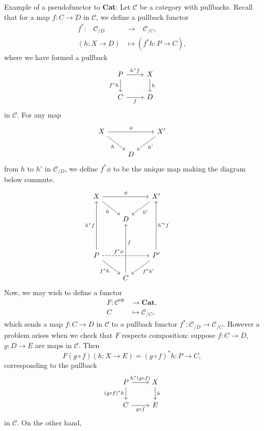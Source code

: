 \documentclass{MetricNotes2023}
\begin{document}
Example of a pseudofunctor to \textbf{Cat}: Let \(\mathcal{C}\) be a category with pullbacks. Recall that for a map \(f : C \to D\) in \(\mathcal{C}\), we define a pullback functor 
\begin{align*}
f^* : \;\;\;\mathcal{C}_{/D}\;\;\;&\to\;\;\; \mathcal{C}_{/C},\\
(h : X \to D) &\mapsto (f^*h : P \to C),
\end{align*}
 where we have formed a pullback 
\[\begin{tikzcd}
P \arrow[r, "h^*f"] \arrow[d, swap, "f^*h"]  & X \arrow[d, "h"]  \\
C \arrow[r, swap, "f"]  & D
\end{tikzcd}\]
in \(\mathscr{C}\). For any map 
\[\begin{tikzcd}
X \arrow[rr, "\phi"] \arrow[dr, swap, "h"]  & & X' \arrow[dl, "h'"]  \\
& D  & 
\end{tikzcd}\]
from \(h\) to \(h'\) in \(\mathcal{C}_{/D}\), we define \(f^*\phi\) to be the unique map making the diagram below commute.
\[\begin{tikzcd}
X \arrow[rr, "\phi"] \arrow[dr, swap, "h"]  & & X' \arrow[dl, "h'"]  \\
& D  & \\
& & & \\
P \arrow[rr, dashrightarrow, "f^*\phi" {xshift=-10pt}] \arrow[uuu, "h^*f"] \arrow[dr, swap, "f^*h"] & & P' \arrow[uuu, swap, "h'^*f"] \arrow[dl, "f^*h'"]\\
& C \arrow[uuu, swap, "f" {yshift=8pt}] & 
\end{tikzcd}\]
Now, we may wish to define a functor 
\begin{align*}
F : \mathcal{C}^{\text{op}} &\to \textbf{Cat},\\
C &\mapsto \mathcal{C}_{/C},
\end{align*}
which sends a map \(f : C \to D\) in \(\mathcal{C}\) to a pullback functor \(f^* : \mathcal{C}_{/D}\to \mathcal{C}_{/C}\). However a problem arises when we check that \(F\) respects composition: suppose \(f : C \to D\), \(g : D \to E\) are maps in \(\mathcal{C}\). Then 
\[F(g \circ f)(h : X \to E)=(g\circ f)^*h : P \to C,\] corresponding to the pullback
\[\begin{tikzcd}
P \arrow[r, "h^*(g\circ f)"] \arrow[d, swap, "(g \circ f)^*h"]  & X \arrow[d, "h"]  \\
C \arrow[r, swap, "g\circ f"]  & E
\end{tikzcd}\]
in \(\mathcal{C}\). On the other hand, 
\end{document}
